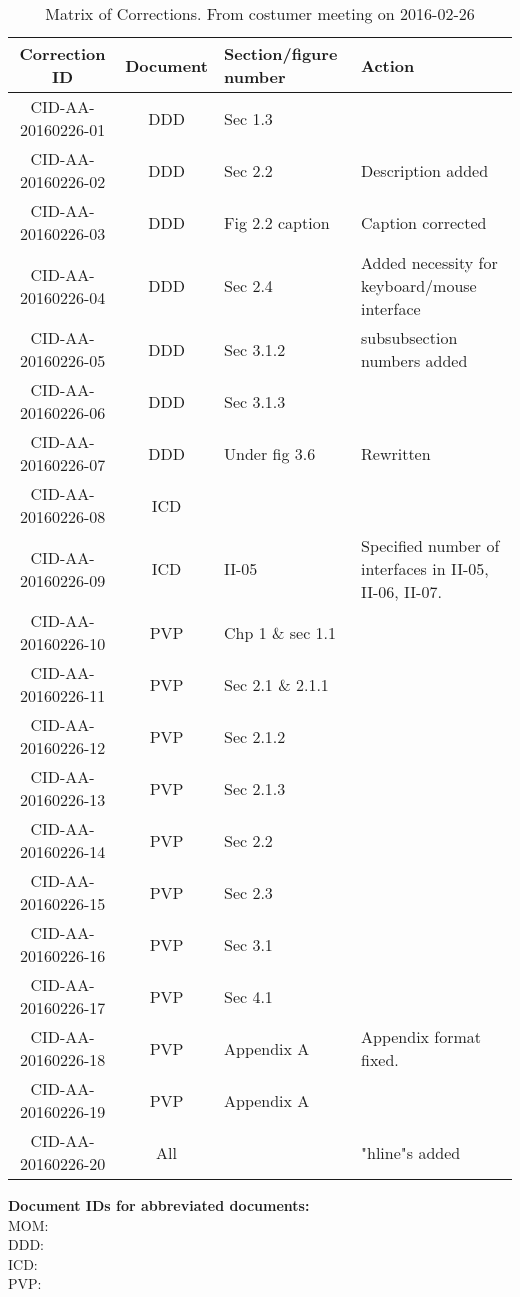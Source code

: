 \begin{table}[ht]
\centering
\begin{tabular}{|c|c|>{\centering\arraybackslash}p{3cm}|>{\centering\arraybackslash}p{5cm}|}
\hline \textbf{Correction ID} & \textbf{Document} & \textbf{Section/figure number} & \textbf{Action} \\ 
\hline CID-AA-20160226-01 & DDD & Sec 1.3 & \\ 
\hline CID-AA-20160226-02 & DDD & Sec 2.2 & Description added\\ 
\hline CID-AA-20160226-03 & DDD & Fig 2.2 caption & Caption corrected\\ 
\hline CID-AA-20160226-04 & DDD & Sec 2.4 & Added necessity for keyboard/mouse interface\\ 
\hline CID-AA-20160226-05 & DDD & Sec 3.1.2 & subsubsection numbers added\\ 
\hline CID-AA-20160226-06 & DDD & Sec 3.1.3 & \\ 
\hline CID-AA-20160226-07 & DDD & Under fig 3.6 & Rewritten\\ 
\hline CID-AA-20160226-08 & ICD &  & \\ 
\hline CID-AA-20160226-09 & ICD & II-05 & Specified number of interfaces in II-05, II-06, II-07. \\ 
\hline CID-AA-20160226-10 & PVP & Chp 1 \& sec 1.1 & \\ 
\hline CID-AA-20160226-11 & PVP & Sec 2.1 \& 2.1.1 & \\ 
\hline CID-AA-20160226-12 & PVP & Sec 2.1.2 & \\ 
\hline CID-AA-20160226-13 & PVP & Sec 2.1.3 & \\ 
\hline CID-AA-20160226-14 & PVP & Sec 2.2 & \\ 
\hline CID-AA-20160226-15 & PVP & Sec 2.3 & \\ 
\hline CID-AA-20160226-16 & PVP & Sec 3.1 & \\ 
\hline CID-AA-20160226-17 & PVP & Sec 4.1 & \\ 
\hline CID-AA-20160226-18 & PVP & Appendix A & Appendix format fixed.\\ 
\hline CID-AA-20160226-19 & PVP & Appendix A & \\ 
\hline CID-AA-20160226-20 & All &  & "hline"s added \\
\hline 
\end{tabular}
\caption{Matrix of Corrections. From costumer meeting on 2016-02-26}
\label{tb:MoC} 
\end{table}

\vspace{20pt}
\noindent \textbf{Document IDs for abbreviated documents:}\\
MOM:        \momFebTwentySix \\
DDD:        \ddd \\
ICD:        \icd \\
PVP:        \pvp \\